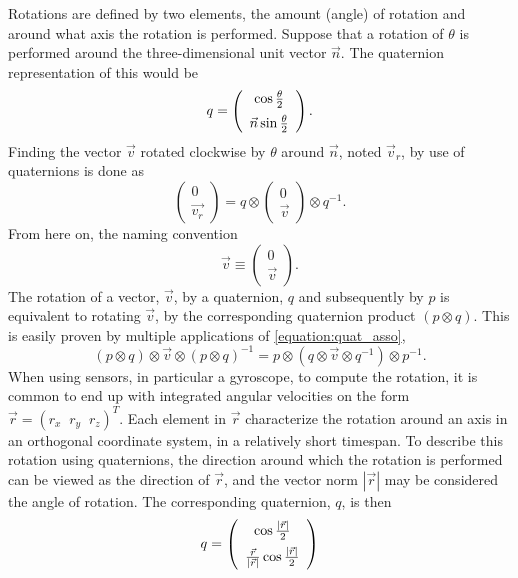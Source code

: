 \documentclass{LTHthesis}
\begin{document}
Rotations are defined by two elements, the amount (angle) of rotation and around what axis the rotation is performed. Suppose that a rotation of $\theta$ is performed around the three-dimensional unit vector $\vec n$. The quaternion representation of this would be
\begin{equation}
q = \left(\begin{array}{c}\cos{\frac{\theta}{2}}\vspace{5pt}\\ \vec{n}\sin{\frac{\theta}{2}}\end{array}\right).
\end{equation}  
%
Finding the vector $\vec v$ rotated clockwise by $\theta$ around $\vec n$, noted $\vec v_r$, by use of quaternions is done as
%
\begin{equation}
\left(\begin{array}{c}0\\ \vec{v_r}\end{array}\right) = q\otimes \left(\begin{array}{c}0\\ \vec{v}\end{array}\right) \otimes q^{-1}.
\end{equation}
%
From here on, the naming convention
%
\begin{equation}
\vec v\equiv \left(\begin{array}{c}0\\ \vec{v}\end{array}\right).
\end{equation}
%
The rotation of a vector, $\vec v$, by a quaternion, $q$ and subsequently by $p$ is equivalent to rotating $\vec v$, by the corresponding quaternion product $(p\otimes q)$. This is easily proven by multiple applications of \ref{equation:quat_asso},
%
\begin{equation}
(p\otimes q)\otimes \vec v \otimes (p\otimes q)^{-1}=p\otimes(q\otimes\vec v\otimes q^{-1})\otimes p^{-1}. 
\end{equation}
%
When using sensors, in particular a gyroscope, to compute the rotation, it is common to end up with integrated angular velocities on the form $\vec{r} = (r_x \; \; r_y \; \; r_z)^T$. Each element in $\vec r$ characterize the rotation around an axis in an orthogonal coordinate system, in a relatively short timespan. To describe this rotation using quaternions, the direction around which the rotation is performed can be viewed as the direction of $\vec r$, and the vector norm $|\vec r|$ may be considered the angle of rotation. The corresponding quaternion, $q$, is then
%
\begin{equation}
q = \left(\begin{array}{c}\cos{\frac{|\vec r|}{2}}\vspace{5pt} \\ \frac{\vec{r}}{|\vec r|}\cos{\frac{|\vec r|}{2}}\end{array}\right)
\end{equation}
%
\end{document}
